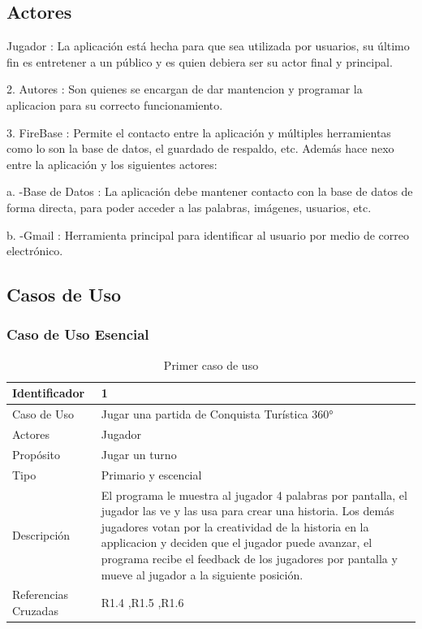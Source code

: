 \subsection{Actores}
Jugador : La aplicación está hecha para que sea utilizada por usuarios, su último fin es entretener a un público y es quien debiera ser su actor final y principal.

2. Autores : Son quienes se encargan de dar mantencion y programar la aplicacion para su correcto funcionamiento.

3. FireBase : Permite el contacto entre la aplicación y múltiples herramientas como lo son la base de datos, el guardado de respaldo, etc. Además hace nexo entre la aplicación y los siguientes actores:

a. -Base de Datos : La aplicación debe mantener contacto con la base de datos de forma directa, para poder acceder a las palabras, imágenes, usuarios, etc.

b. -Gmail : Herramienta principal para identificar al usuario por medio de correo electrónico.
\subsection{Casos de Uso}
\subsubsection{Caso de Uso Esencial}
\begin{table}[H]
    \begin{center}
        \begin{tabular}{| l | m{12cm} |}        
        	\hline 
        	Identificador & 1\\
        	\hline
        	Caso de Uso & Jugar una partida de Conquista Turística
360°\\
        	\hline
        	Actores & Jugador\\
        	\hline
        	Propósito & Jugar un turno\\
        	\hline
        	Tipo & Primario y escencial\\
        	\hline
        	Descripción & El programa le muestra al jugador 4 palabras por pantalla, el jugador las ve y las usa para crear una historia. Los demás jugadores votan por la creatividad de la historia en la applicacion y deciden que el jugador puede avanzar, el programa recibe el feedback de los jugadores por pantalla y mueve al jugador a la siguiente posición.\\
        	\hline
        	Referencias Cruzadas & R1.4 ,R1.5 ,R1.6\\
        	\hline
        \end{tabular}
    \caption{Primer caso de uso}
    \end{center}
\end{table}

